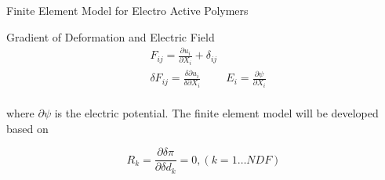 \documentclass{beamer}
\begin{document}
\begin{frame}{Finite Element Model for Electro Active Polymers}

\begin{block}{Gradient of Deformation and Electric Field}
\begin{equation} 
\begin{aligned}
& F_{ij}=\frac{\partial u_i}{\partial X_{i}}+\delta_{ij} \\
& \delta F_{ij}=\frac{\delta \partial u_i}{\delta \partial X_{i}}
&E_{i}=\frac{\partial \psi}{\partial X_{i}}\\
\end{aligned}
\label{EQN:Disp_F_Relation}
\end{equation}
\end{block} 

where $\partial \psi$ is the electric potential.
The finite element model will be developed based on 

\begin{equation}
R_k=\frac{\partial \delta \pi}{\partial \delta d_k}=0 ,(k=1\dots NDF)
\label{EQN:ResidualRepresentation}
\end{equation}

\end{frame}
\end{document}
